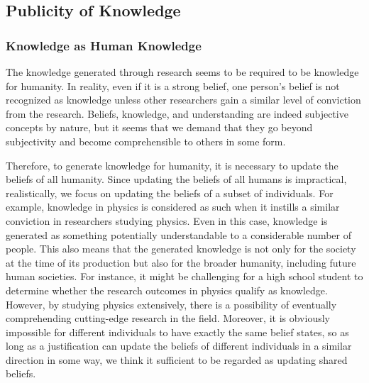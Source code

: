 \subsection{Publicity of Knowledge}
\subsubsection{Knowledge as Human Knowledge}
The knowledge generated through research seems to be required to be knowledge for humanity. In reality, even if it is a strong belief, one person's belief is not recognized as knowledge unless other researchers gain a similar level of conviction from the research. Beliefs, knowledge, and understanding are indeed subjective concepts by nature, but it seems that we demand that they go beyond subjectivity and become comprehensible to others in some form. 

Therefore, to generate knowledge for humanity, it is necessary to update the beliefs of all humanity. Since updating the beliefs of all humans is impractical, realistically, we focus on updating the beliefs of a subset of individuals. For example, knowledge in physics is considered as such when it instills a similar conviction in researchers studying physics. Even in this case, knowledge is generated as something potentially understandable to a considerable number of people. This also means that the generated knowledge is not only for the society at the time of its production but also for the broader humanity, including future human societies. For instance, it might be challenging for a high school student to determine whether the research outcomes in physics qualify as knowledge. However, by studying physics extensively, there is a possibility of eventually comprehending cutting-edge research in the field. Moreover, it is obviously impossible for different individuals to have exactly the same belief states, so as long as a justification can update the beliefs of different individuals in a similar direction in some way, we think it sufficient to be regarded as updating shared beliefs.



